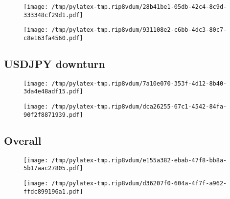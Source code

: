 \documentclass{article}%
\begin{document}
\begin{figure}[htbp]%
\centering%
\texttt{[image: /tmp/pylatex-tmp.rip8vdum/28b41be1-05db-42c4-8c9d-333348cf29d1.pdf]}%
\end{figure}

%


\begin{figure}[htbp]%
\centering%
\texttt{[image: /tmp/pylatex-tmp.rip8vdum/931108e2-c6bb-4dc3-80c7-c8e163fa4560.pdf]}%
\end{figure}

%
\newpage %
\subsection{USDJPY downturn}%
\label{subsec:USDJPYdownturn}%


\begin{figure}[htbp]%
\centering%
\texttt{[image: /tmp/pylatex-tmp.rip8vdum/7a10e070-353f-4d12-8b40-3da4e48adf15.pdf]}%
\end{figure}

%


\begin{figure}[htbp]%
\centering%
\texttt{[image: /tmp/pylatex-tmp.rip8vdum/dca26255-67c1-4542-84fa-90f2f8871939.pdf]}%
\end{figure}

%
\newpage %
\subsection{Overall}%
\label{subsec:Overall}%


\begin{figure}[htbp]%
\centering%
\texttt{[image: /tmp/pylatex-tmp.rip8vdum/e155a382-ebab-47f8-bb8a-5b17aac27805.pdf]}%
\end{figure}

%


\begin{figure}[htbp]%
\centering%
\texttt{[image: /tmp/pylatex-tmp.rip8vdum/d36207f0-604a-4f7f-a962-ffdc899196a1.pdf]}%
\end{figure}

%
\end{document}
